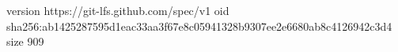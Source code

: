 version https://git-lfs.github.com/spec/v1
oid sha256:ab1425287595d1eac33aa3f67e8c05941328b9307ee2e6680ab8c4126942c3d4
size 909
